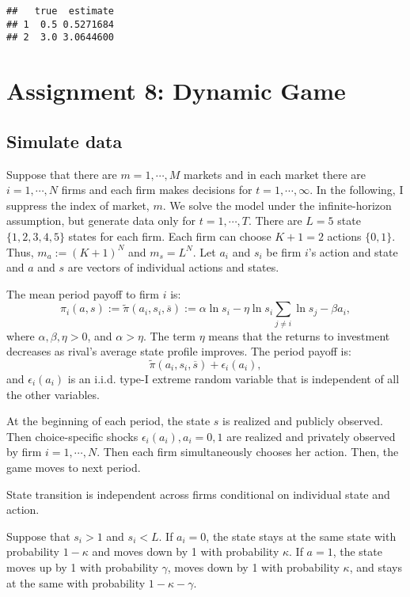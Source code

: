 \documentclass[
]{book}
\begin{document}
\begin{verbatim}
##   true  estimate
## 1  0.5 0.5271684
## 2  3.0 3.0644600
\end{verbatim}

\hypertarget{assignment8}{%
\chapter{Assignment 8: Dynamic Game}\label{assignment8}}

\hypertarget{simulate-data-7}{%
\section{Simulate data}\label{simulate-data-7}}

Suppose that there are \(m = 1, \cdots, M\) markets and in each market there are \(i = 1, \cdots, N\) firms and each firm makes decisions for \(t = 1, \cdots, \infty\). In the following, I suppress the index of market, \(m\). We solve the model under the infinite-horizon assumption, but generate data only for \(t = 1, \cdots, T\). There are \(L = 5\) state \(\{1, 2, 3, 4, 5\}\) states for each firm. Each firm can choose \(K + 1 = 2\) actions \(\{0, 1\}\). Thus, \(m_a := (K + 1)^N\) and \(m_s = L^N\). Let \(a_i\) and \(s_i\) be firm \(i\)'s action and state and \(a\) and \(s\) are vectors of individual actions and states.

The mean period payoff to firm \(i\) is:
\[
\pi_i(a, s) := \tilde{\pi}(a_i, s_i, \overline{s}) :=  \alpha \ln s_i - \eta \ln s_i \sum_{j \neq i} \ln s_j - \beta a_i,
\]
where \(\alpha, \beta, \eta> 0\), and \(\alpha > \eta\). The term \(\eta\) means that the returns to investment decreases as rival's average state profile improves. The period payoff is:
\[
\tilde{\pi}(a_i, s_i, \overline{s})+ \epsilon_i(a_i),
\]
and \(\epsilon_i(a_i)\) is an i.i.d. type-I extreme random variable that is independent of all the other variables.

At the beginning of each period, the state \(s\) is realized and publicly observed. Then choice-specific shocks \(\epsilon_i(a_i), a_i = 0, 1\) are realized and privately observed by firm \(i = 1, \cdots, N\). Then each firm simultaneously chooses her action. Then, the game moves to next period.

State transition is independent across firms conditional on individual state and action.

Suppose that \(s_i > 1\) and \(s_i < L\). If \(a_i = 0\), the state stays at the same state with probability \(1 - \kappa\) and moves down by 1 with probability \(\kappa\). If \(a = 1\), the state moves up by 1 with probability \(\gamma\), moves down by 1 with probability \(\kappa\), and stays at the same with probability \(1 - \kappa - \gamma\).
\end{document}
